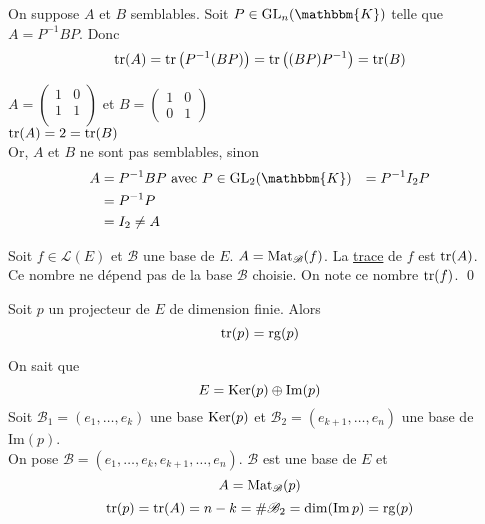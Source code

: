 \begin{prv}
	On suppose $A$ et $B$ semblables. Soit $P \in \mathrm{GL}_n(\mathbbm{K})$ telle que $A = P^{-1}BP$. Donc \[
		\operatorname{tr}(A) = \operatorname{tr}\big(P^{-1}(BP)\big) = \operatorname{tr}\big((BP)P^{-1}\big) = \operatorname{tr}(B)
	\]
\end{prv}

\begin{rmk}
	$A = \begin{pmatrix}
		1&0\\
		1&1\\
	\end{pmatrix}$ et $B = \begin{pmatrix}
		1&0\\
		0&1
	\end{pmatrix}$ \\
	$\operatorname{tr}(A) = 2 = \operatorname{tr}(B)$\\
	Or, $A$ et $B$ ne sont pas semblables, sinon
	\begin{align*}
		A &= P^{-1} B P \text{ avec } P \in \mathrm{GL}_2(\mathbbm{K})
		&= P^{-1} I_2 P \\
		&= P^{-1} P \\
		&= I_2 \neq A \\
	\end{align*}
\end{rmk}

\begin{crlr}
	Soit $f \in \mathcal{L}(E)$ et $\mathcal{B}$ une base de $E$. $A = \operatorname{Mat}_{\mathcal{B}}(f)$. La \underline{trace} de $f$ est $\operatorname{tr}(A)$.\\
	Ce nombre ne dépend pas de la base $\mathcal{B}$ choisie. On note ce nombre $\operatorname{tr}(f)$.
	\qed
\end{crlr}

\begin{prop}
	Soit $p$ un projecteur de $E$ de dimension finie. Alors \[
		\operatorname{tr}(p) = \operatorname{rg}(p)
	\]
\end{prop}

\begin{prv}
	On sait que \[
		E = \operatorname{Ker}(p) \oplus \mathrm{Im}(p)
	\] Soit $\mathcal{B}_1 = (e_1, \ldots, e_k)$ une base $\operatorname{Ker}(p)$ et $\mathcal{B}_2 = (e_{k+1}, \ldots, e_n)$ une base de $\mathrm{Im}(p)$.\\
	On pose $\mathcal{B} = (e_1, \ldots, e_k, e_{k+1}, \ldots, e_n)$. $\mathcal{B}$ est une base de $E$ et \[
		A = \operatorname{Mat}_\mathcal{B}(p)
	\] %
	\[
		\operatorname{tr}(p) = \operatorname{tr}(A) = n - k = \# \mathcal{B}_2 = \dim(\mathrm{Im}\, p) = \operatorname{rg}(p)
	\]
\end{prv}

